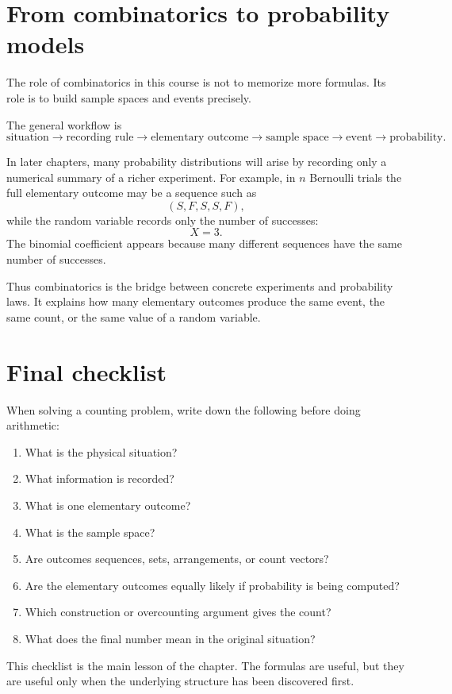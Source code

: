 \section{From combinatorics to probability models}

The role of combinatorics in this course is not to memorize more formulas. Its role is to build sample spaces and events precisely.

The general workflow is
\[
\text{situation}
\longrightarrow
\text{recording rule}
\longrightarrow
\text{elementary outcome}
\longrightarrow
\text{sample space}
\longrightarrow
\text{event}
\longrightarrow
\text{probability}.
\]

In later chapters, many probability distributions will arise by recording only a numerical summary of a richer experiment. For example, in \(n\) Bernoulli trials the full elementary outcome may be a sequence such as
\[
(S,F,S,S,F),
\]
while the random variable records only the number of successes:
\[
X=3.
\]
The binomial coefficient appears because many different sequences have the same number of successes.

Thus combinatorics is the bridge between concrete experiments and probability laws. It explains how many elementary outcomes produce the same event, the same count, or the same value of a random variable.

\section{Final checklist}

When solving a counting problem, write down the following before doing arithmetic:

\begin{enumerate}
    \item What is the physical situation?
    \item What information is recorded?
    \item What is one elementary outcome?
    \item What is the sample space?
    \item Are outcomes sequences, sets, arrangements, or count vectors?
    \item Are the elementary outcomes equally likely if probability is being computed?
    \item Which construction or overcounting argument gives the count?
    \item What does the final number mean in the original situation?
\end{enumerate}

This checklist is the main lesson of the chapter. The formulas are useful, but they are useful only when the underlying structure has been discovered first.
